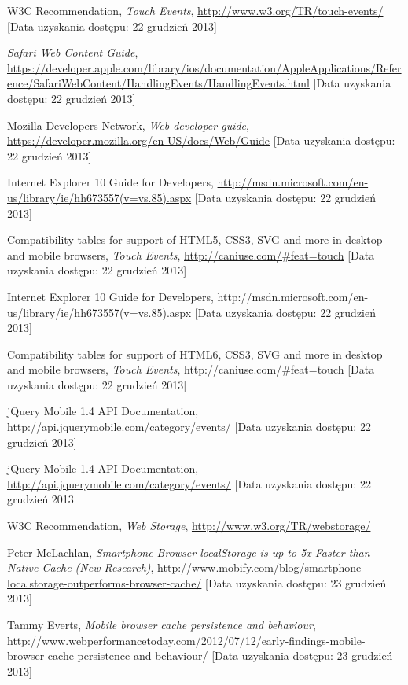 \begin{thebibliography}{1}
   W3C Recommendation, {\em Touch Events}, \url{http://www.w3.org/TR/touch-events/} [Data uzyskania dostępu: 22 grudzień 2013]
  
   {\em Safari Web Content Guide}, \url{https://developer.apple.com/library/ios/documentation/AppleApplications/Reference/SafariWebContent/HandlingEvents/HandlingEvents.html} [Data uzyskania dostępu: 22 grudzień 2013]
  
   Mozilla Developers Network, {\em Web developer guide}, \url{https://developer.mozilla.org/en-US/docs/Web/Guide} [Data uzyskania dostępu: 22 grudzień 2013]
  
   Internet Explorer 10 Guide for Developers, \url{http://msdn.microsoft.com/en-us/library/ie/hh673557(v=vs.85).aspx} [Data uzyskania dostępu: 22 grudzień 2013]
  
   Compatibility tables for support of HTML5, CSS3, SVG and more in desktop and mobile browsers, {\em Touch Events}, \url{http://caniuse.com/\#feat=touch} [Data uzyskania dostępu: 22 grudzień 2013]
  
   Internet Explorer 10 Guide for Developers, http://msdn.microsoft.com/en-us/library/ie/hh673557(v=vs.85).aspx [Data uzyskania dostępu: 22 grudzień 2013]
  
   Compatibility tables for support of HTML6, CSS3, SVG and more in desktop and mobile browsers, {\em Touch Events}, http://caniuse.com/\#feat=touch [Data uzyskania dostępu: 22 grudzień 2013]
  
   jQuery Mobile 1.4 API Documentation, http://api.jquerymobile.com/category/events/ [Data uzyskania dostępu: 22 grudzień 2013]
  
   jQuery Mobile 1.4 API Documentation, \url{http://api.jquerymobile.com/category/events/} [Data uzyskania dostępu: 22 grudzień 2013]
  
   W3C Recommendation, {\em Web Storage}, \url{http://www.w3.org/TR/webstorage/}
  
   Peter McLachlan, \emph{Smartphone Browser localStorage is up to 5x Faster than Native Cache (New Research)}, \url{http://www.mobify.com/blog/smartphone-localstorage-outperforms-browser-cache/} [Data uzyskania dostępu: 23 grudzień 2013]

   Tammy Everts, \emph{Mobile browser cache persistence and behaviour}, \url{http://www.webperformancetoday.com/2012/07/12/early-findings-mobile-browser-cache-persistence-and-behaviour/} [Data uzyskania dostępu: 23 grudzień 2013]


\end{thebibliography}
